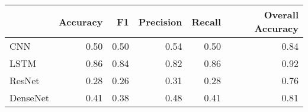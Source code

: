 \begin{tabular}{lrrrrr}
\toprule
{} &  Accuracy &    F1 &  Precision &  Recall &  Overall Accuracy \\
\midrule
CNN      &      0.50 &  0.50 &       0.54 &    0.50 &              0.84 \\
LSTM     &      0.86 &  0.84 &       0.82 &    0.86 &              0.92 \\
ResNet   &      0.28 &  0.26 &       0.31 &    0.28 &              0.76 \\
DenseNet &      0.41 &  0.38 &       0.48 &    0.41 &              0.81 \\
\bottomrule
\end{tabular}
